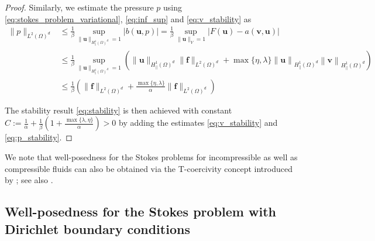\documentclass[final,leqno]{scrarticle}
\newcommand{\norm}[1]{\left\| #1 \right\|}
\newcommand{\Htd}{{H^1_\|(\Omega)^d}}
\newcommand{\lzd}{{L^2(\Omega)^d}}
\begin{document}
\begin{proof}
Similarly, we estimate the pressure $p$ using \eqref{eq:stokes_problem_variational}, \eqref{eq:inf_sup} and \eqref{eq:v_stability} as
\begin{equation}
\label{eq:p_stability}
\begin{split}
   \| p \|_\lzd & \leq \frac{1}{\beta} \sup_{\| \mathbf{u} \|_{\Htd}= 1} | b (\mathbf{u},p) |
   = \frac{1}{\beta} \sup_{ \| \mathbf{u} \|_V= 1}  | F (\mathbf{u}) - a(\mathbf{v},\mathbf{u}) | \\
   & \leq \frac{1}{\beta} \sup_{ \| \mathbf{u} \|_{\Htd}= 1} \left( \|\mathbf{u}\|_{\Htd} \|\mathbf{f}\|_\lzd + \max \lbrace \eta, \lambda \rbrace \norm{\mathbf{u}}_{\Htd} \norm{\mathbf{v}}_{\Htd} \right)  \\
   &
   \leq \frac{1}{\beta} \left( \|\mathbf{f}\|_{\lzd} + \frac{\max\lbrace \eta,\lambda\rbrace }{\alpha} \| \mathbf{f} \|_\lzd \right) 
   \end{split}
\end{equation}

The stability result  \eqref{eq:stability} is then achieved with constant $C:= \frac{1}{\alpha}+\frac{1}{\beta}(1+\frac{\max\lbrace \lambda,\eta\rbrace}{\alpha}) >0$ by adding the estimates \eqref{eq:v_stability} and \eqref{eq:p_stability}.
\end{proof}

We note that well-posedness for the Stokes problems for incompressible as well as compressible fluids can also be obtained via the T-coercivity concept introduced by \cite{Cia25}; see also \cite{Hal21}. 

\subsection{Well-posedness for the Stokes problem with Dirichlet boundary conditions}
\end{document}
